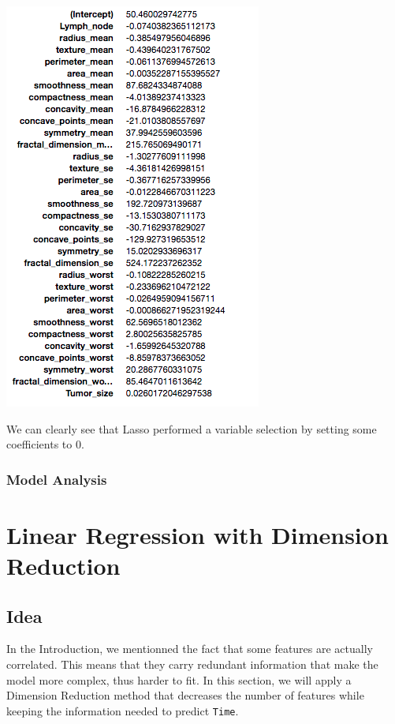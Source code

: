 \documentclass[]{report}
\begin{document}
\begin{center}
	\includegraphics[width=0.8\linewidth]{Figures/ridge_coeff}
\end{center}

We can clearly see that Lasso performed a variable selection by setting some coefficients to 0.

\subsubsection{Model Analysis}

\section{Linear Regression with Dimension Reduction}
\subsection{Idea}
In the Introduction, we mentionned the fact that some features are actually correlated. This means that they carry redundant information that make the model more complex, thus harder to fit. In this section, we will apply a Dimension Reduction method that decreases the number of features while keeping the information needed to predict \texttt{Time}.
\end{document}
